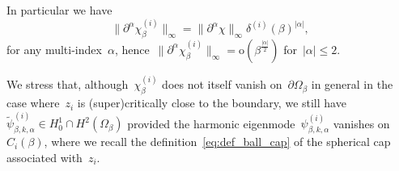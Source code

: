 \documentclass[10pt]{article}
\newcommand{\1}{\mathbbm 1}
\newcommand{\deltai}{\delta^{(i)}}
\renewcommand{\o}{\mathrm{o}}
\begin{document}
    In particular we have
    \begin{equation}
        \label{eq:linf_bound_nabla_chi}
        \|\partial^\alpha\chi_\beta^{(i)}\|_\infty = \|\partial^\alpha \chi\|_\infty \deltai(\beta)^{|\alpha|},
    \end{equation}
    for any multi-index~$\alpha$, hence~$\|\partial^\alpha \chi_\beta^{(i)}\|_\infty = \o(\beta^{\frac{|\alpha|}2})$ for~$|\alpha|\leq 2$.
    
    We stress that, although~$\chi_\beta^{(i)}$ does not itself vanish on~$\partial \Omega_\beta$ in general in the case where~$z_i$ is (super)critically close to the boundary, we still have
   ~$\widetilde\psi_{\beta,k,\alpha}^{(i)}\in H_0^1\cap H^2(\Omega_\beta)$ provided the harmonic eigenmode~$\psi_{\beta,k,\alpha}^{(i)}$ vanishes on~$C_i(\beta)$, where we recall the definition~\eqref{eq:def_ball_cap} of the spherical cap associated with~$z_i$.
    
\end{document}
